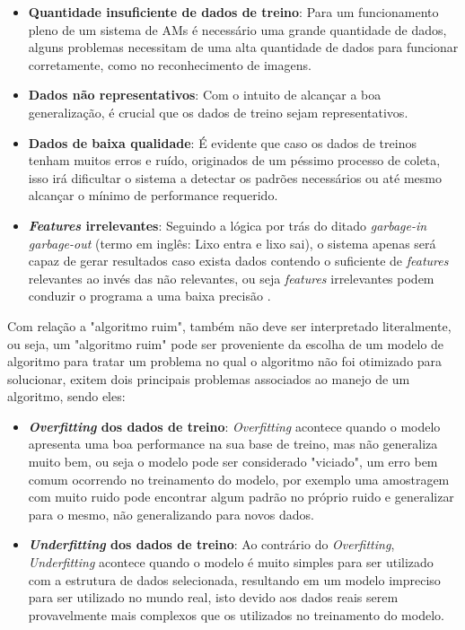 \begin{itemize}
    \item \textbf{Quantidade insuficiente de dados de treino}: Para um funcionamento pleno de um sistema de AMs é necessário uma grande quantidade de dados, alguns problemas necessitam de uma alta quantidade de dados para funcionar corretamente, como no reconhecimento de imagens.
    \item \textbf{Dados não representativos}: Com o intuito de alcançar a boa generalização, é crucial que os dados de treino sejam representativos.
    \item \textbf{Dados de baixa qualidade}: É evidente que caso os dados de treinos tenham muitos erros e ruído, originados de um péssimo processo de coleta, isso irá dificultar o sistema a detectar os padrões necessários ou até mesmo alcançar o mínimo de performance requerido.
    \item \textbf{\textit{Features}  irrelevantes}: Seguindo a lógica por trás do ditado \textit{garbage-in garbage-out} (termo em inglês: Lixo entra e lixo sai), o sistema apenas será capaz de gerar resultados caso exista dados contendo o suficiente de \textit{features} relevantes ao invés das não relevantes, ou seja \textit{features} irrelevantes podem conduzir o programa a uma baixa precisão .
\end{itemize}

Com relação a "algoritmo ruim", também não deve ser interpretado literalmente, ou seja, um "algoritmo ruim" pode ser proveniente da escolha de um modelo de algoritmo para tratar um problema no qual o algoritmo não foi otimizado para solucionar, exitem dois principais problemas associados ao manejo de um algoritmo, sendo eles:

\begin{itemize}
    \item \textbf{\textit{Overfitting} dos dados de treino}: \textit{Overfitting} acontece quando o modelo apresenta uma boa performance na sua base de treino, mas não generaliza muito bem, ou seja o modelo pode ser considerado "viciado", um erro bem comum ocorrendo no treinamento do modelo, por exemplo uma amostragem com muito ruido pode encontrar algum padrão no próprio ruido e generalizar para o mesmo, não generalizando para novos dados.
    \item \textbf{\textit{Underfitting} dos dados de treino}: Ao contrário do \textit{Overfitting}, \textit{Underfitting} acontece quando o modelo é muito simples para ser utilizado com a estrutura de dados selecionada, resultando em um modelo impreciso para ser utilizado no mundo real, isto devido aos dados reais serem provavelmente mais complexos que os utilizados no treinamento do modelo.
\end{itemize}

